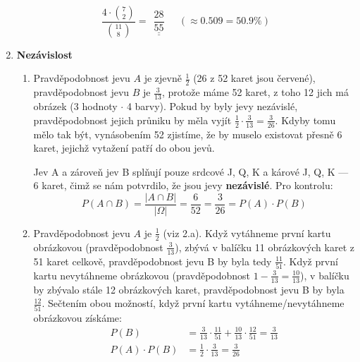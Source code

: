 \documentclass[12pt]{article}
\begin{document}
\begin{enumerate}
      \[
        \frac{4 \cdot \binom{7}{2}}{\binom{11}{8}} = \underline{\underline{\ \ \frac{28}{55}\ \ }} \quad \left(\approx 0.509 = {{50.9\%}}\right)
      \]

  \item \textbf{Nezávislost}
    \begin{enumerate}
      \item Pravděpodobnost jevu $A$ je zjevně $\frac{1}{2}$ (26 z 52 karet jsou červené), pravděpodobnost jevu $B$ je $\frac{3}{13}$,
        protože máme 52 karet, z toho 12 jich má obrázek (3 hodnoty $\cdot$ 4 barvy). Pokud by byly jevy nezávislé,
        pravděpodobnost jejich průniku by měla vyjít $\frac{1}{2} \cdot \frac{3}{13} = \frac{3}{26}$.
        Kdyby tomu mělo tak být, vynásobením 52 zjistíme, že by muselo existovat přesně 6 karet,
        jejichž vytažení patří do obou jevů.

        Jev A a zároveň jev B splňují pouze srdcové J, Q, K a kárové J, Q, K --- 6 karet, čimž se nám potvrdilo, že jsou jevy \textbf{nezávislé}.
        Pro kontrolu:
        \[
          P(A \cap B) = \frac{|A \cap B|}{|\Omega|} = \frac{6}{52} = \frac{3}{26} = P(A) \cdot P(B)
        \]
      \item Pravděpodobnost jevu $A$ je $\frac{1}{2}$ (viz 2.a). Když vytáhneme první kartu obrázkovou (pravděpodobnost $\frac{3}{13}$),
        zbývá v balíčku 11 obrázkových karet z 51 karet celkově, pravděpodobnost jevu B by byla tedy $\frac{11}{51}$.
        Když první kartu nevytáhneme obrázkovou (pravděpodobnost $1 - \frac{3}{13} = \frac{10}{13}$),
        v balíčku by zbývalo stále 12 obrázkových karet, pravděpodobnost jevu B by byla $\frac{12}{51}$.
        Sečtením obou možností, když první kartu vytáhneme/nevytáhneme obrázkovou získáme:
        \begin{align*}
          P(B) &= \frac{3}{13} \cdot \frac{11}{51} + \frac{10}{13} \cdot \frac{12}{51} = \frac{3}{13} \\
          P(A) \cdot P(B) &= \frac{1}{2} \cdot \frac{3}{13} = \frac{3}{26}
        \end{align*}


\end{enumerate}
\end{enumerate}
\end{document}

